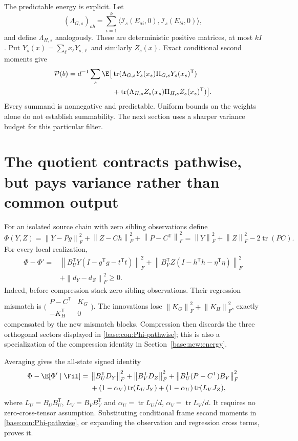 \documentclass[11pt,oneside,openany,a4paper]{book}
\numberwithin{equation}{chapter}
\theoremstyle{definition}
\theoremstyle{remark}
\newcommand{\T}{\mathsf T}\newcommand{\Id}{I}
\newcommand{\F}[1]{\left\lVert#1\right\rVert_F}
\DeclareMathOperator{\tr}{tr}\DeclareMathOperator{\rank}{rank}
\begin{document}
The predictable energy is explicit. Let
\[
 (\Lambda_{G,s})_{ab}=\sum_{i=1}^k
 \langle\mathcal I_s(E_{ai},0),\mathcal I_s(E_{bi},0)\rangle,
\]
and define $\Lambda_{H,s}$ analogously. These are deterministic positive matrices, at most $kI$. Put $Y_s(x)=\sum_\ell x_\ell Y_{s,\ell}$ and similarly $Z_s(x)$. Exact conditional second moments give
\begin{equation}\label{base:con:P-explicit}
 \begin{split}
 \mathcal P(b)=d^{-1}\sum_s\E\bigl[&\tr(\Lambda_{G,s}Y_s(x_s)\Pi_{G,s}Y_s(x_s)^\T)\\
 &+\tr(\Lambda_{H,s}Z_s(x_s)\Pi_{H,s}Z_s(x_s)^\T)\bigr].
 \end{split}
\end{equation}
Every summand is nonnegative and predictable. Uniform bounds on the weights alone do not establish summability. The next section uses a sharper variance budget for this particular filter.

\section{The quotient contracts pathwise, but pays variance rather than common output}\label{base:con:quotient}
For an isolated source chain with zero sibling observations define
\begin{equation}\label{base:con:Phi}
 \Phi(Y,Z)=\F{Y-Pg}^2+\F{Z-Ch}^2+\F{P-C^\T}^2
 =\F Y^2+\F Z^2-2\tr(PC).
\end{equation}
For every local realization,
\begin{equation}\label{base:con:Phi-pathwise}
 \begin{split}
 \Phi-\Phi'={}&\F{B_U^\T Y(I-g^\T g-t^\T t)}^2
 +\F{B_V^\T Z(I-h^\T h-\eta^\T\eta)}^2\\
 &+\F{d_Y-d_Z}^2\ge0.
 \end{split}
\end{equation}
Indeed, before compression stack zero sibling observations. Their regression mismatch is
$\bigl(\begin{smallmatrix}P-C^\T&K_G\\-K_H^\T&0\end{smallmatrix}\bigr)$.
The innovations lose $\F{K_G}^2+\F{K_H}^2$, exactly compensated by the new mismatch blocks. Compression then discards the three orthogonal sectors displayed in \eqref{base:con:Phi-pathwise}; this is also a specialization of the compression identity in Section~\ref{base:new:energy}.

Averaging gives the all-state signed identity
\begin{equation}\label{base:con:Phi-mean}
 \begin{split}
 \Phi-\E[\Phi'\mid\Fil]={}&\F{B_U^\T D_Y}^2+\F{B_V^\T D_Z}^2
 +\F{B_U^\T(P-C^\T)B_V}^2\\
 &+(1-\alpha_V)\tr(L_UJ_Y)+(1-\alpha_U)\tr(L_VJ_Z),
 \end{split}
\end{equation}
where $L_U=B_UB_U^\T$, $L_V=B_VB_V^\T$ and
$\alpha_U=\tr L_U/d$, $\alpha_V=\tr L_V/d$. It requires no zero-cross-tensor assumption. Substituting conditional frame second moments in \eqref{base:con:Phi-pathwise}, or expanding the observation and regression cross terms, proves it.
\end{document}
